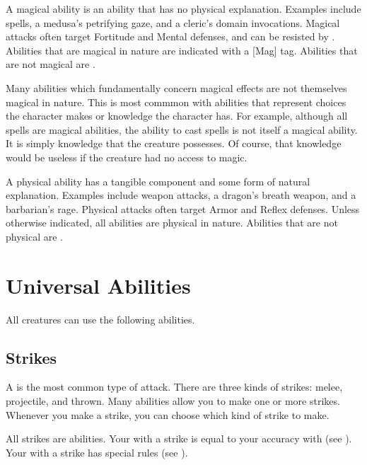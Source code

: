         \label{Magical Abilities} A magical ability is an ability that has no physical explanation.
        Examples include spells, a medusa's petrifying gaze, and a cleric's domain invocations.
        Magical attacks often target Fortitude and Mental defenses, and can be resisted by .
        Abilities that are magical in nature are indicated with a [Mag] tag.
        Abilities that are not magical are .

        Many abilities which fundamentally concern magical effects are not themselves magical in nature.
        This is most commmon with abilities that represent choices the character makes or knowledge the character has.
        For example, although all spells are magical abilities, the ability to cast spells is not itself a magical ability.
        It is simply knowledge that the creature possesses.
        Of course, that knowledge would be useless if the creature had no access to magic.

        \label{Physical Abilities} A physical ability has a tangible component and some form of natural explanation.
        Examples include weapon attacks, a dragon's breath weapon, and a barbarian's rage.
        Physical attacks often target Armor and Reflex defenses.
        Unless otherwise indicated, all abilities are physical in nature.
        Abilities that are not physical are .

\section{Universal Abilities}
    All creatures can use the following abilities.

    \subsection{Strikes}\label{Strikes}
        A  is the most common type of attack.
        There are three kinds of strikes: melee, projectile, and thrown.
        Many abilities allow you to make one or more strikes.
        Whenever you make a strike, you can choose which kind of strike to make.

        All strikes are  abilities.
        Your  with a strike is equal to your accuracy with  (see ).
        Your  with a strike has special rules (see ).

